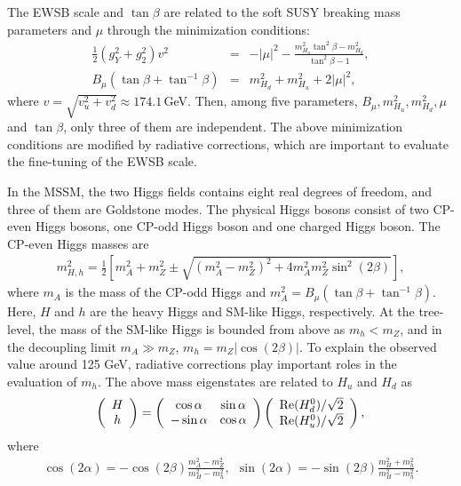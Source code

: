 \documentclass[preprint,3p,12pt]{elsarticle}
\begin{document}
The EWSB scale and $\tan\beta$ are related to the soft SUSY breaking mass parameters and $\mu$ through the minimization conditions:
\begin{eqnarray}
\frac{1}{2} (g_Y^2 + g_2^2) v^2   &=& - |\mu|^2 - \frac{m_{H_u}^2\tan^2\beta - m_{H_d}^2}{\tan^2\beta-1} , \nonumber \\
B_\mu (\tan\beta + \tan^{-1}\beta) &=& m_{H_d}^2 + m_{H_u}^2 + 2|\mu|^2,
\end{eqnarray}
where $v = \sqrt{v_u^2 + v_d^2} \approx 174.1$\,GeV. Then, among five parameters, $B_\mu, m_{H_u}^2, m_{H_d}^2, \mu$ and $\tan\beta$, 
only three of them are independent. The above minimization conditions are modified by radiative corrections, which are important to evaluate the fine-tuning of the EWSB scale.


In the MSSM, the two Higgs fields contains eight real degrees of freedom, and three of them are Goldstone modes. 
The physical Higgs bosons consist of two CP-even Higgs bosons, 
one CP-odd Higgs boson and one charged Higgs boson.
%
The CP-even Higgs masses are
\begin{eqnarray}
m_{H,h}^2 = \frac{1}{2} \left[ 
m_A^2 + m_Z^2 \pm \sqrt{(m_A^2-m_Z^2)^2+4 m_A^2 m_Z^2 \sin^2 (2\beta)}
\right],
\end{eqnarray}
where $m_A$ is the mass of the CP-odd Higgs and $m_A^2 = B_\mu (\tan\beta + \tan^{-1}\beta)$. 
Here, $H$ and $h$ are the heavy Higgs and SM-like Higgs, respectively. 
At the tree-level, the mass of the SM-like Higgs is bounded from above as $m_{h} < m_Z$, and in the decoupling limit $m_A \gg m_Z$, $m_h = m_Z |\cos(2\beta)|$. To explain the observed value around 125 GeV, 
radiative corrections play important roles in the evaluation of $m_h$.
The above mass eigenstates are related to $H_u$ and $H_d$ as
\begin{eqnarray}
\left(
\begin{array}{c}
 H    \\
 h
\end{array}
\right)
=
\left(
\begin{array}{cc}
  \cos\alpha &  \sin\alpha    \\
-\sin\alpha  &  \cos\alpha     
\end{array}
\right)
\left(
\begin{array}{c}
 {\rm Re}(H_d^0)/\sqrt{2} \\
 {\rm Re}(H_u^0)/\sqrt{2} 
\end{array}
\right),
\end{eqnarray}
where
\begin{eqnarray}
\cos(2\alpha) = -\cos (2\beta) \frac{m_A^2-m_Z^2}{m_H^2-m_h^2}, \ \ 
\sin(2\alpha) = -\sin (2\beta)\frac{m_H^2 + m_h^2}{m_H^2-m_h^2}.
\end{eqnarray}
\end{document}
